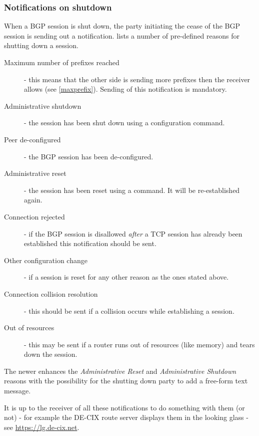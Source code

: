 \subsubsection{Notifications on shutdown}
When a BGP session is shut down, the party initiating the cease of the BGP session is sending out a notification.  lists a number of pre-defined reasons for shutting down a session.
\begin{description}
  \item[Maximum number of prefixes reached] - this means that the other side is sending more prefixes then the receiver allows (see \ref{maxprefix}). Sending of this notification is mandatory.
  \item[Administrative shutdown] - the session has been shut down using a configuration command.
  \item[Peer de-configured] -  the BGP session has been de-configured.
  \item[Administrative reset] - the session has been reset using a command. It will be re-established again.
  \item[Connection rejected] - if the BGP session is disallowed \emph{after} a TCP session has already been established this notification should be sent.
  \item[Other configuration change] - if a session is reset for any other reason as the ones stated above.
  \item[Connection collision resolution] - this should be sent if a collision occurs  while establishing a session.
  \item[Out of resources] - this may be sent if a router runs out of resources (like memory) and tears down the session.
\end{description}

The newer  enhances the \emph{Administrative Reset} and \emph{Administrative Shutdown} reasons with the possibility for the shutting down party to add a free-form text message.

It is up to the receiver of all these notifications to do something with them (or not) - for example the DE-CIX route server displays them in the looking glass - see \url{https://lg.de-cix.net}.

